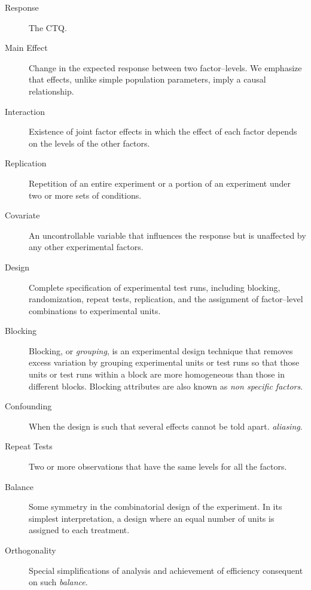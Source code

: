 \begin{description}
\item [Response] The CTQ.

\item [Main Effect] Change in the expected response between two factor–levels.  We emphasize that effects, unlike simple population parameters, imply a causal relationship.

\item [Interaction] Existence of joint factor effects in which the effect of each factor depends on the levels of the other factors.

\item [Replication] Repetition of an entire experiment or a portion of an experiment under two or more sets of conditions.

\item [Covariate]  An uncontrollable variable that influences the response but is
unaffected by any other experimental factors.

\item [Design]  Complete specification of experimental test runs, including blocking, randomization, repeat tests, replication, and the assignment of factor–level combinations to experimental units.

\item [Blocking]  Blocking, or \emph{grouping}, is an experimental design technique that removes excess variation by grouping experimental units or test runs so that those units or test runs within a block are more homogeneous than those in different blocks. Blocking attributes are also known as \emph{non specific factors}.

\item [Confounding] When the design is such that several effects cannot be told apart. \Aka \emph{aliasing}.

\item [Repeat Tests] Two or more observations that have the same levels for all the factors.

\item [Balance] Some symmetry in the combinatorial design of the experiment. In its simplest interpretation, a design where an equal number of units is assigned to each treatment.

\item [Orthogonality]  Special simplifications of analysis and achievement of efficiency consequent on such \emph{balance}.
\end{description}








